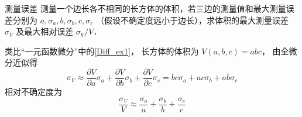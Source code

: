 \begin{exam}{测量误差}
测量一个边长各不相同的长方体的体积，若三边的测量值和最大测量误差分别为 $a, \sigma_a, b, \sigma_b, c, \sigma_c$ （假设不确定度远小于边长），求体积的最大测量误差 $\sigma_V$ 及最大相对误差 $\sigma_V/V$．

类比“一元函数微分”中的\autoref{Diff_ex1}， 长方体的体积为 $V(a,b,c) = abc$， 由全微分近似得
\begin{equation}
{\sigma _V} \approx \frac{{\partial V}}{{\partial a}}{\sigma _a} + \frac{{\partial V}}{{\partial b}}{\sigma _b} + \frac{{\partial V}}{{\partial c}}{\sigma _c} = bc{\sigma _a} + ac{\sigma _b} + ab{\sigma _c}
\end{equation}
相对不确定度为
\begin{equation}
\frac{{{\sigma _V}}}{V} \approx \frac{{{\sigma _a}}}{a} + \frac{{{\sigma _b}}}{b} + \frac{{{\sigma _c}}}{c}
\end{equation}

\end{exam}